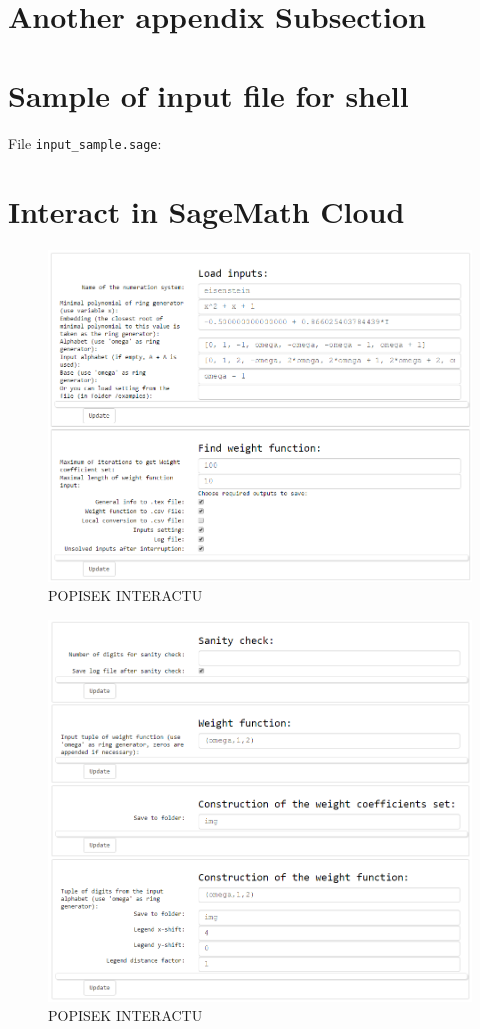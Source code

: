 \section{Another appendix Subsection}


\newpage
\section{Sample of input file for shell}
File \verb+input_sample.sage+:
\label{app:inputSample}



\section{Interact in SageMath Cloud}
\label{app:interact}


\begin{figure}[htbp]
  \centering
  \includegraphics[width=\textwidth]{img/interact1.png}
  \caption{POPISEK INTERACTU}
  \label{fig:interact1}
\end{figure}

\begin{figure}[htbp]
  \centering
  \includegraphics[width=\textwidth]{img/interact2.png}
  \caption{POPISEK INTERACTU}
  \label{fig:interact2}
\end{figure}
